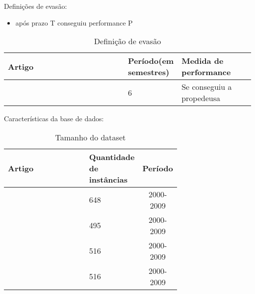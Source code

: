



Definições de evasão:

\begin{itemize}
\item após prazo T conseguiu performance P
\end{itemize}

\begin{table}
\begin{tabular}{p{0.5\linewidth}m{0.2\linewidth}p{0.3\linewidth}}
\toprule
                            Artigo &  Período(em semestres) & Medida de performance\\
\midrule
  \cite{Predicting_Students} &  6 & Se conseguiu a propedeusa \\
\bottomrule
\end{tabular}
\caption{Definição de evasão}
\label{table:study_attributes_definicao}
\end{table}


Características da base de dados:

\begin{table}
\begin{tabular}{p{0.5\linewidth}p{0.2\linewidth}c}
\toprule
                            Artigo &  Quantidade de instâncias & Período\\
\midrule
  \cite{Predicting_Students} &  648 & 2000-2009\\
  &  495 & 2000-2009\\
  &  516 & 2000-2009\\
  &  516 & 2000-2009\\
\bottomrule
\end{tabular}
\caption{Tamanho do dataset}
\label{table:study_attributes_dataset}
\end{table}






